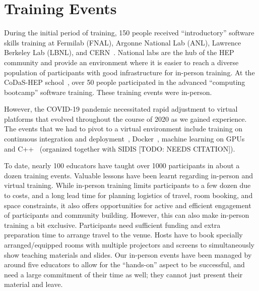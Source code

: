 \documentclass[twocolumn]{svjour3}          %
\begin{document}
\section{Training Events}\label{sec:Training}

During the initial period of training, 150 people received \enquote{introductory} software skills training at Fermilab (FNAL), Argonne National Lab (ANL), Lawrence Berkeley Lab (LBNL), and CERN~\cite{HSF-training-SC-FNAL-2019,HSF-training-ATLAS-ANL-2019,HSF-training-ATLAS-LBNL-2019,HSF-training-SC-CERN-2019}. National labs are the hub of the HEP community and provide an environment where it is easier to reach a diverse population of participants with good infrastructure for in-person training. At the CoDaS-HEP school~\cite{codas-hep}, over 50 people participated in the advanced \enquote{computing bootcamp} software training. These training events were in-person.

However, the COVID-19 pandemic necessitated rapid adjustment to virtual platforms that evolved throughout the course of 2020 as we gained experience. The events that we had to pivot to a virtual environment include training on continuous integration and deployment~\cite{cicd_gitlab,cicd_github}, Docker~\cite{docker}, machine learning on GPUs~\cite{mlgpu} and C++~\cite{cplusplus1} (organized together with SIDIS [TODO: NEEDS CITATION]).

To date, nearly 100 educators have taught over 1000 participants in about a dozen training events. Valuable lessons have been learnt regarding in-person and virtual training. While in-person training limits participants to a few dozen due to costs, and a long lead time for planning logistics of travel, room booking, and space constraints, it also offers opportunities for active and efficient engagement of participants and community building. However, this can also make in-person training a bit exclusive. Participants need sufficient funding and extra preparation time to arrange travel to the venue. Hosts have to book specially arranged/equipped rooms with multiple projectors and screens to simultaneously show teaching materials and slides. Our in-person events have been managed by around five educators to allow for the \enquote{hands-on} aspect to be successful, and need a large commitment of their time as well; they cannot just present their material and leave.
\end{document}
